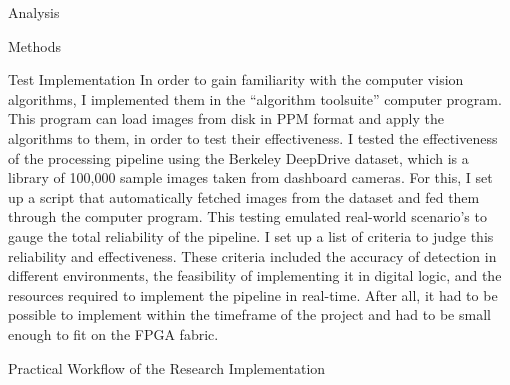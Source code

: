 \documentclass{matthijs}
\begin{document}
\begin{hoofdstuk}{Analysis}
\begin{paragraaf}{Methods}
\begin{subparagraaf}{Test Implementation}
				In order to gain familiarity with the computer vision algorithms, I implemented them in the ``algorithm toolsuite'' computer program.
				This program can load images from disk in PPM format and apply the algorithms to them, in order to test their effectiveness.
				I tested the effectiveness of the processing pipeline using the Berkeley DeepDrive dataset, which is a library of 100,000 sample images taken from dashboard cameras.
				For this, I set up a script that automatically fetched images from the dataset and fed them through the computer program.
				This testing emulated real-world scenario's to gauge the total reliability of the pipeline.
				I set up a list of criteria to judge this reliability and effectiveness.
				These criteria included the accuracy of detection in different environments, the feasibility of implementing it in digital logic, and the resources required to implement the pipeline in real-time.
				After all, it had to be possible to implement within the timeframe of the project and had to be small enough to fit on the FPGA fabric.

				\begin{figuur}{Practical Workflow of the Research Implementation}
					\centerline{}
				\end{figuur}


\end{subparagraaf}
\end{paragraaf}
\end{hoofdstuk}
\end{document}
